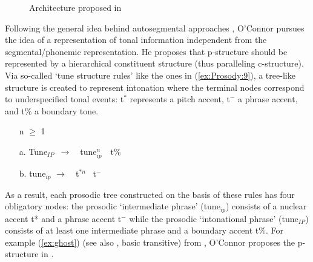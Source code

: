 \documentclass[output=paper,hidelinks]{langscibook}
\begin{document}
\begin{figure}
\centering
{}
\caption{Architecture proposed in \citet[Fig 6.3, 142, modified]{Oconnor2005}}
\label{fig:Prosody:OConnor}
\end{figure}

\noindent Following the general idea behind autosegmental approaches \citep{Goldsmith1976}, O'Connor pursues the idea of a representation of tonal information independent from the segmental/phonemic representation. 
He proposes that p-structure should be represented by a hierarchical constituent structure (thus paralleling c-structure). Via so-called `tune structure rules' like the ones in (\ref{ex:Prosody:9}), a tree-like structure is created to represent intonation where the terminal nodes correspond to underspecified tonal events: t$^{*}$ represents a pitch accent, t$^-$ a phrase accent, and t\% a boundary tone.

\ea\label{ex:Prosody:9}\begin{itemize}
    \item[] n $\geq$ 1
    \item[a.] {\sc Tune}$_{IP}$\ $\rightarrow$\ \ tune$_{ip}^n$\ \  t\%
    \item[b.] \hspace{0.4ex}tune$_{ip}$   \hspace{1.2ex} $\rightarrow$\ \ t$^{*n}$\hspace{3ex} \  t$^-$
    \end{itemize}
\z

\noindent As a result, each prosodic tree constructed on the basis of these rules has four obligatory nodes: the prosodic `intermediate phrase' ({tune}$_{ip}$) consists of a nuclear accent t* and a phrase accent t$^-$ while the prosodic `intonational phrase' ({\sc tune}$_{IP}$) consists of at least one intermediate phrase and a boundary accent t\%.
For example (\ref{ex:ghost}) (see also , basic
transitive) from \citet{buttking98}, O'Connor proposes the p-structure in .
\end{document}

